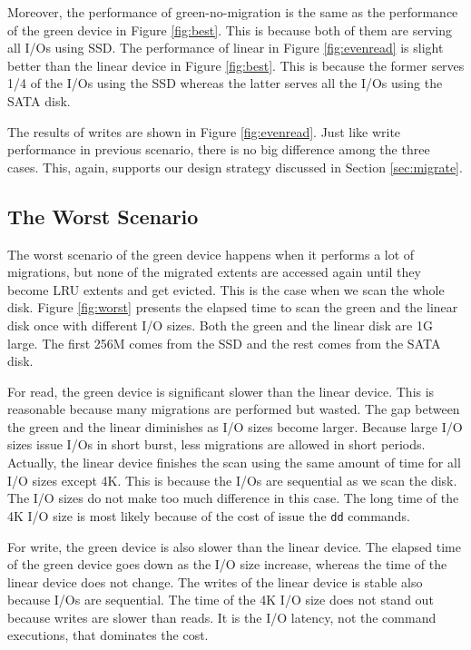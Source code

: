 Moreover, the performance of green-no-migration is the same as the
performance of the green device in Figure \ref{fig:best}. This is
because both of them are serving all I/Os using SSD. The performance
of linear in Figure \ref{fig:evenread} is slight better than the
linear device in Figure \ref{fig:best}. This is because the former
serves 1/4 of the I/Os using the SSD whereas the latter serves all the
I/Os using the SATA disk.

The results of writes are shown in Figure \ref{fig:evenread}. Just
like write performance in previous scenario, there is no big
difference among the three cases. This, again, supports our design
strategy discussed in Section \ref{sec:migrate}.

\subsection{The Worst Scenario}

The worst scenario of the green device happens when it performs a lot
of migrations, but none of the migrated extents are accessed again
until they become LRU extents and get evicted. This is the case when
we scan the whole disk. Figure \ref{fig:worst} presents the elapsed
time to scan the green and the linear disk once with different I/O
sizes. Both the green and the linear disk are 1G large. The first 256M
comes from the SSD and the rest comes from the SATA disk.

For read, the green device is significant slower than the linear
device. This is reasonable because many migrations are performed but
wasted. The gap between the green and the linear diminishes as I/O
sizes become larger. Because large I/O sizes issue I/Os in short burst,
less migrations are allowed in short periods. Actually, the linear
device finishes the scan using the same amount of time for all I/O
sizes except 4K. This is because the I/Os are sequential as we scan
the disk. The I/O sizes do not make too much difference in this case.
The long time of the 4K I/O size is most likely because of the cost of
issue the \texttt{dd} commands. 

For write, the green device is also slower than the linear device. The
elapsed time of the green device goes down as the I/O size increase,
whereas the time of the linear device does not change. The writes of
the linear device is stable also because I/Os are sequential. The time
of the 4K I/O size does not stand out because writes are slower than
reads. It is the I/O latency, not the command executions, that
dominates the cost. 

